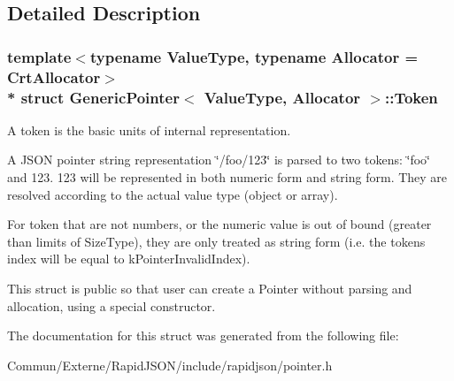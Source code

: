 \subsection{Detailed Description}
\subsubsection*{template$<$typename Value\+Type, typename Allocator = Crt\+Allocator$>$\\*
struct Generic\+Pointer$<$ Value\+Type, Allocator $>$\+::\+Token}

A token is the basic units of internal representation. 

A J\+S\+ON pointer string representation \char`\"{}/foo/123\char`\"{} is parsed to two tokens\+: \char`\"{}foo\char`\"{} and 123. 123 will be represented in both numeric form and string form. They are resolved according to the actual value type (object or array).

For token that are not numbers, or the numeric value is out of bound (greater than limits of Size\+Type), they are only treated as string form (i.\+e. the token\textquotesingle{}s index will be equal to k\+Pointer\+Invalid\+Index).

This struct is public so that user can create a Pointer without parsing and allocation, using a special constructor. 

The documentation for this struct was generated from the following file\+:\begin{DoxyCompactItemize}
\item 
Commun/\+Externe/\+Rapid\+J\+S\+O\+N/include/rapidjson/pointer.\+h\end{DoxyCompactItemize}
